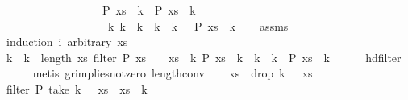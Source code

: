 \begin{isabellebody}
\ \ \ \ \ \ \ \ \ \ \ \ \ \ \ \ \ \ P\ {\isacharparenleft}xs\ {\isacharbang}\ k{}{\isacharparenright}\ {\isasymand}\ P\ {\isacharparenleft}xs\ {\isacharbang}\ k{}{\isacharparenright}\ {\isasymand}\ \isanewline
\ \ \ \ \ \ \ \ \ \ \ \ \ \ \ \ \ \ {\isacharparenleft}{\isasymforall}\ k{\isacharprime}{\isachardot}\ k{}\ {\isacharless}\ k{\isacharprime}\ {\isasymand}\ k{\isacharprime}\ {\isacharless}\ k{}\ {\isasymlongrightarrow}\ {\isasymnot}\ P\ {\isacharparenleft}xs\ {\isacharbang}\ k{\isacharprime}{\isacharparenright}{\isacharparenright}{\isachardoublequoteclose}\isanewline
%
\isadelimproof
\ \ %
\endisadelimproof
%
\isatagproof
{}\isamarkupfalse%
\ assms\isanewline
{}\isamarkupfalse%
\ {\isacharparenleft}induction\ i\ arbitrary{\isacharcolon}\ xs{\isacharparenright}\isanewline
\ \ \isamarkupfalse%
\ {}\isanewline
\ \ \isamarkupfalse%
\ \isamarkupfalse%
\ k{}\ \ {\isachardoublequoteopen}k{}\ {\isacharless}\ length\ xs{\isachardoublequoteclose}\ {\isachardoublequoteopen}filter\ P\ xs\ {\isacharbang}\ {}\ {\isacharequal}\ xs\ {\isacharbang}\ k{}{\isachardoublequoteclose}\ {\isachardoublequoteopen}P\ {\isacharparenleft}xs\ {\isacharbang}\ k{}{\isacharparenright}{\isachardoublequoteclose}\ {\isachardoublequoteopen}{\isasymforall}\ k{\isacharprime}\ {\isacharless}\ k{}{\isachardot}\ {\isasymnot}\ P\ {\isacharparenleft}xs\ {\isacharbang}\ k{\isacharprime}{\isacharparenright}{\isachardoublequoteclose}\isanewline
\ \ \ \ \isamarkupfalse%
\ hd{\isacharunderscore}filter\isanewline
\ \ \ \ \isamarkupfalse%
\ {\isacharparenleft}metis\ gr{\isacharunderscore}implies{\isacharunderscore}not{\isacharunderscore}zero\ length{\isacharunderscore}{}{\isacharunderscore}conv{\isacharparenright}\isanewline
\ \ \isamarkupfalse%
\ {\isacharquery}xs\ {\isacharequal}\ {\isachardoublequoteopen}drop\ {\isacharparenleft}k{}\ {\isacharplus}\ {}{\isacharparenright}\ xs{\isachardoublequoteclose}\isanewline
\ \ \isamarkupfalse%
\ {\isachardoublequoteopen}filter\ P\ {\isacharparenleft}take\ {\isacharparenleft}k{}\ {\isacharplus}\ {}{\isacharparenright}\ xs{\isacharparenright}\ {\isacharequal}\ {\isacharbrackleft}xs\ {\isacharbang}\ k{}{\isacharbrackright}{\isachardoublequoteclose}\isanewline
\ \ \isamarkupfalse%

\end{isabellebody}
